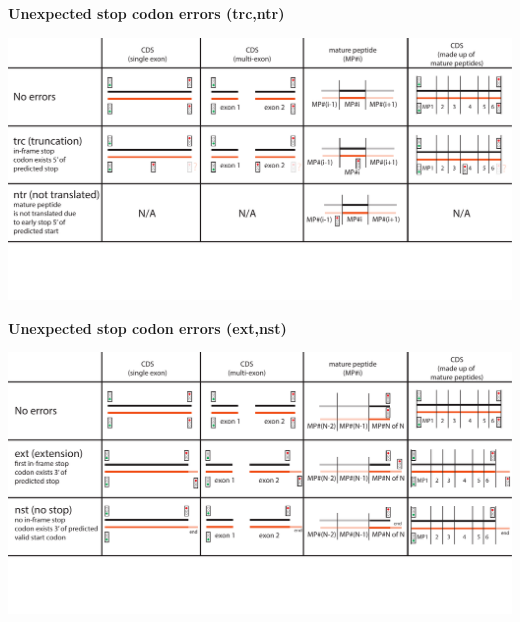 \documentclass[landscape]{slides}
\begin{document}
\begin{slide}
\begin{center}
\textbf{Unexpected stop codon errors (trc,ntr)}
\vspace{0.5in}

\includegraphics[width=10in]{figs/error-1-trc-ntr}
\end{center}
\vfill
\end{slide}
\begin{slide}
\begin{center}
\textbf{Unexpected stop codon errors (ext,nst)}
\vspace{0.5in}

\includegraphics[width=10in]{figs/error-2-ext-nst}
\end{center}
\vfill
\end{slide}
\end{document}
